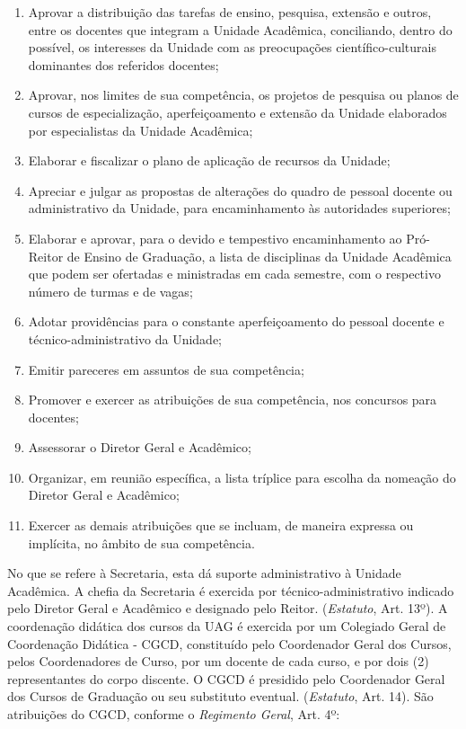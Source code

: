 \documentclass[
	12pt,				%
	openright,			%
  oneside,     %
	a4paper,			%
	chapter=TITLE,		%
	english,			%
	french,				%
	spanish,			%
	brazil				%
	]{abntex2}
\begin{document}
\begin{enumerate}
    \item Aprovar a distribuição das tarefas de ensino, pesquisa, extensão e outros, entre os docentes que integram a Unidade Acadêmica, conciliando, dentro do possível, os interesses da Unidade com as preocupações científico-culturais dominantes dos referidos docentes;
    \item Aprovar, nos limites de sua competência, os projetos de pesquisa ou planos de cursos de especialização, aperfeiçoamento e extensão da Unidade elaborados por especialistas da Unidade Acadêmica;
    \item Elaborar e fiscalizar o plano de aplicação de recursos da Unidade;
    \item Apreciar e julgar as propostas de alterações do quadro de pessoal docente ou administrativo da Unidade, para encaminhamento às autoridades superiores;
    \item Elaborar e aprovar, para o devido e tempestivo encaminhamento ao Pró-Reitor de Ensino de Graduação, a lista de disciplinas da Unidade Acadêmica que podem ser ofe­rtadas e ministradas em cada semestre, com o respectivo número de turmas e de vagas;
    \item Adotar providências para o 	constante aperfeiçoamento do pessoal docente e 	técnico-administrativo da Unidade;
    \item Emitir pareceres em assuntos de sua competência;
    \item Promover e exercer as atribuições de sua competência, nos concursos para docentes;
    \item Assessorar o Diretor Geral e 	Acadêmico; 
    \item Organizar, em reunião específica, a lista tríplice para escolha da nomeação do Diretor Geral e Acadêmico;
    \item Exercer as demais atribuições que se incluam, de maneira expressa ou implícita, no âmbito de sua 	competência.
\end{enumerate}

No que se refere à Secretaria, esta dá suporte administrativo à Unidade Acadêmica. A chefia da Secretaria é exercida por técnico-administrativo indicado pelo Diretor Geral e Acadêmico e designado pelo Reitor. (\textit{Estatuto}, Art. 13º). A coordenação didática dos cursos da UAG é exercida por um Colegiado Geral de Coordenação Didática - CGCD, constituído pelo Coordenador Geral dos Cursos, pelos Coordenadores de Curso, por um docente de cada curso, e por dois (2) representantes do corpo discente. O CGCD é presidido pelo Coordenador Geral dos Cursos de Graduação ou seu substituto eventual. (\textit{Estatuto}, Art. 14). São atribuições do CGCD, conforme o \textit{Regimento Geral}, Art. 4º:
\end{document}
